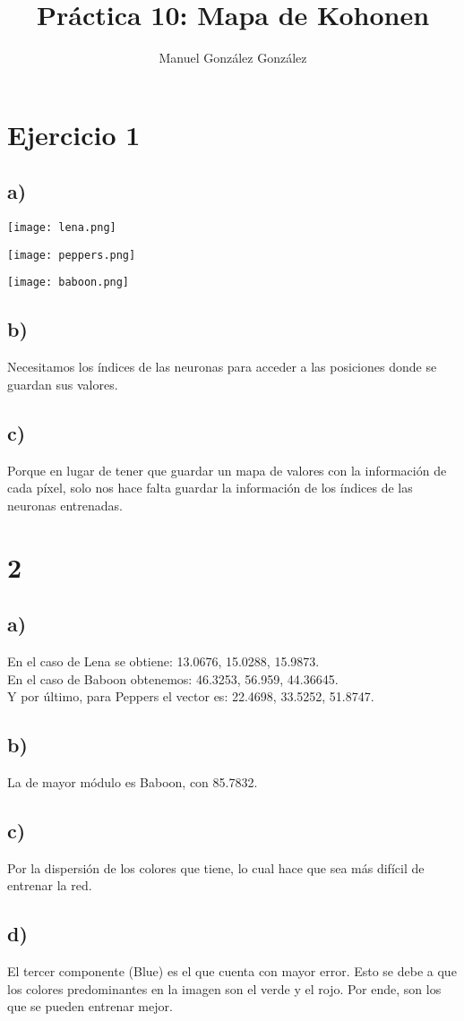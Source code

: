 \documentclass[11pt,a4paper]{article}
\author{Manuel González González}
\title{Práctica 10: Mapa de Kohonen}
\begin{document}
\maketitle

\section*{Ejercicio 1}
\subsection*{a)}
\texttt{[image: lena.png]}

\texttt{[image: peppers.png]}

\texttt{[image: baboon.png]}

\subsection*{b)}

Necesitamos los índices de las neuronas para acceder a las posiciones donde se guardan sus valores.

\subsection*{c)}
Porque en lugar de tener que guardar un mapa de valores con la información de cada píxel, solo nos hace falta guardar la información de los índices de las neuronas entrenadas.

\section*{2}
\subsection*{a)}
En el caso de Lena se obtiene: 13.0676, 15.0288, 15.9873.\\

En el caso de Baboon obtenemos: 46.3253, 56.959, 44.36645.\\

Y por último, para Peppers el vector es: 22.4698, 33.5252, 51.8747.

\subsection*{b)}
La de mayor módulo es Baboon, con 85.7832.

\subsection*{c)}
Por la dispersión de los colores que tiene, lo cual hace que sea más difícil de entrenar la red.

\subsection*{d)}
El tercer componente (Blue) es el que cuenta con mayor error. Esto se debe a que los colores predominantes en la imagen son el verde y el rojo. Por ende, son los que se pueden entrenar mejor.
\end{document}

